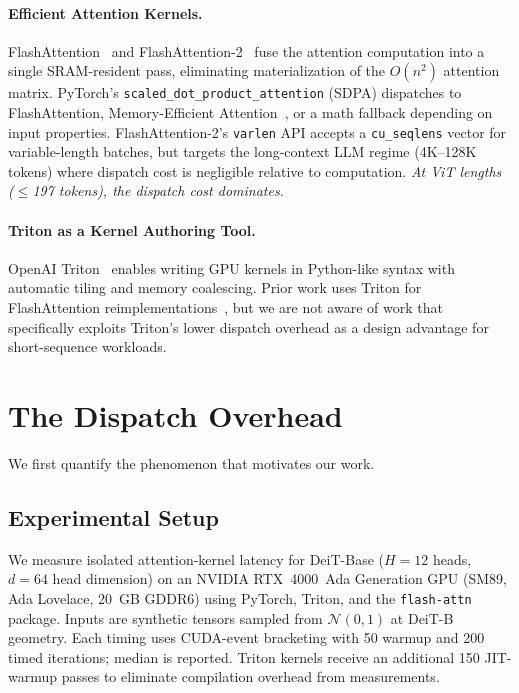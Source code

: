 \documentclass[conference]{IEEEtran}
\begin{document}
\paragraph{Efficient Attention Kernels.}
FlashAttention~\cite{dao2022flashattention} and
FlashAttention-2~\cite{dao2023flashattention2} fuse the attention
computation into a single SRAM-resident pass, eliminating
materialization of the $O(n^2)$ attention matrix.
PyTorch's \texttt{scaled\_dot\_product\_attention} (SDPA) dispatches
to FlashAttention, Memory-Efficient
Attention~\cite{rabe2022selfattention}, or a math fallback depending
on input properties.
FlashAttention-2's \texttt{varlen} API accepts a \texttt{cu\_seqlens}
vector for variable-length batches, but targets the long-context
LLM regime (4K--128K tokens) where dispatch cost is negligible
relative to computation.
\emph{At ViT lengths ($\leq$197 tokens), the dispatch cost dominates.}

\paragraph{Triton as a Kernel Authoring Tool.}
OpenAI Triton~\cite{tillet2019triton} enables writing GPU kernels in
Python-like syntax with automatic tiling and memory coalescing.
Prior work uses Triton for FlashAttention
reimplementations~\cite{triton2023tutorial}, but we are not aware of
work that specifically exploits Triton's lower dispatch overhead as
a design advantage for short-sequence workloads.

\section{The Dispatch Overhead}\label{sec:dispatch}

We first quantify the phenomenon that motivates our work.

\subsection{Experimental Setup}

We measure isolated attention-kernel latency for DeiT-Base
($H{=}12$ heads, $d{=}64$ head dimension) on an NVIDIA RTX~4000~Ada
Generation GPU (SM89, Ada Lovelace, 20~GB GDDR6) using
PyTorch, Triton, and the \texttt{flash-attn} package.
Inputs are synthetic tensors sampled from $\mathcal{N}(0,1)$ at
DeiT-B geometry.
Each timing uses CUDA-event bracketing with 50 warmup and 200 timed
iterations; median is reported.
Triton kernels receive an additional 150 JIT-warmup passes to
eliminate compilation overhead from measurements.
\end{document}
